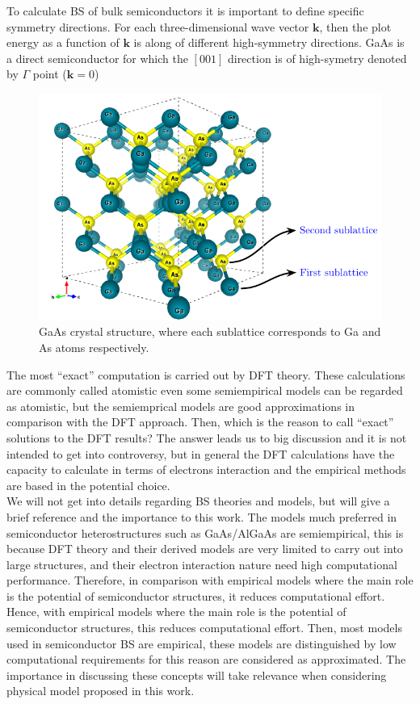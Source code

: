 To calculate \gls{BS} of bulk semiconductors it is important to define specific symmetry directions. For each three-dimensional wave vector $\boldsymbol{k}$, then the plot energy as a function of $\boldsymbol{k}$ is along of different high-symmetry directions\cite{piprek2017handbook}.  GaAs is a direct semiconductor for which the $\left[001\right]$ direction is of high-symetry denoted by $\Gamma$ point ($\boldsymbol{k}=0$)
\begin{figure}[h!]
	\centering
	\includegraphics[width=\linewidth]{../figures/chapter-1/bulk-1/build/bulk-1}
	\caption{
		 GaAs crystal structure, where each sublattice corresponds to Ga and As atoms respectively. }
	\label{fig:subsubsection-1.1.1-bulk-1}
\end{figure}

The most ``exact'' computation is carried out by DFT theory. These calculations are  commonly  called atomistic even some  semiempirical models can be regarded as atomistic, but the semiemprical models are good approximations in comparison with the DFT approach. Then, which is the reason to call ``exact'' solutions to the DFT results? The answer leads us to big discussion and  it is not intended to get into controversy,  but in general the DFT calculations have the capacity to calculate in terms of electrons interaction and the empirical methods are based in the potential choice.\\
 
We will not get into details regarding BS theories and models, but will give a brief reference and the importance to this work. The models much preferred in semiconductor heterostructures such as GaAs/AlGaAs are semiempirical, this is because
\gls{DFT} theory and their derived models are very limited to carry out into large structures, and
their electron interaction nature need high computational performance. Therefore, in comparison
with empirical models where the main role is the potential of semiconductor structures, it reduces computational effort. Hence, with empirical models where the main role is the potential of semiconductor structures, this reduces computational effort. Then, most models used in semiconductor BS are empirical, these models are distinguished by low computational requirements for this reason are considered as approximated. The importance in discussing these concepts will take relevance when considering physical model proposed in this work. 

